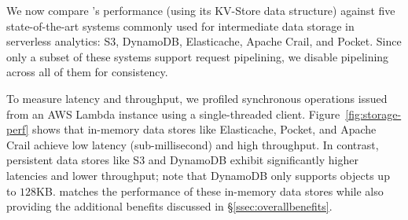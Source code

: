 We now compare \jiffy’s performance (using its KV-Store data structure) against five state-of-the-art systems commonly used for intermediate data storage in serverless analytics: S3, DynamoDB, Elasticache, Apache Crail, and Pocket. Since only a subset of these systems support request pipelining, we disable pipelining across all of them for consistency.

To measure latency and throughput, we profiled synchronous operations issued from an AWS Lambda instance using a single-threaded client. Figure~\ref{fig:storage-perf} shows that in-memory data stores like Elasticache, Pocket, and Apache Crail achieve low latency (sub-millisecond) and high throughput. In contrast, persistent data stores like S3 and DynamoDB exhibit significantly higher latencies and lower throughput; note that DynamoDB only supports objects up to $128$KB. \jiffy matches the performance of these in-memory data stores while also providing the additional benefits discussed in \S\ref{ssec:overallbenefits}.


